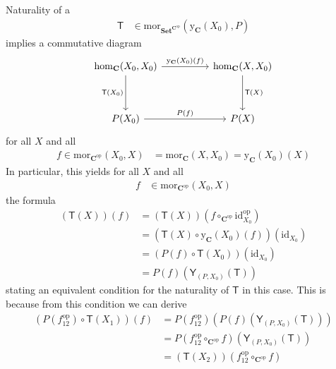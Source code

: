 \begin{prf}
Naturality of a
\begin{align*}
  \mathsf{T}
  &\in
  \mathrm{mor}_{\mathbf{Set}^{\mathbf{C}^{\mathrm{op}}}}
  (\mathrm{y}_{\mathbf{C}}(X_{0}),P)
\end{align*}
implies a commutative diagram
\[
\begin{tikzcd}[sep=huge]
  \mathrm{hom}_{\mathbf{C}}(X_{0},X_{0})
  \arrow{r}{\mathrm{y}_{\mathbf{C}}(X_{0})(f)}
  \arrow[swap]{d}{\mathsf{T}(X_{0})}
  &
  \mathrm{hom}_{\mathbf{C}}(X,X_{0})
  \arrow{d}{\mathsf{T}(X)}
  \\
  P(X_{0})
  \arrow{r}{P(f)}
  &
  P(X)
\end{tikzcd}
\]
for all $X$ and all
\begin{align*}
  f
  \in
  \mathrm{mor}_{\mathbf{C}^{\mathrm{op}}}(X_{0},X)
  &=
  \mathrm{mor}_{\mathbf{C}}(X,X_{0})
  =
  \mathrm{y}_{\mathbf{C}}(X_{0})(X)
\end{align*}  
In particular, this yields for all $X$ and all
\begin{align*}
  f
  &\in
  \mathrm{mor}_{\mathbf{C}^{\mathrm{op}}}(X_{0},X)
\end{align*}
the formula
\begin{align*}
  (\mathsf{T}(X))(f)
  &=
  (\mathsf{T}(X))
  \left(
    f
    \circ_{\mathbf{C}^{\mathrm{op}}}
    \mathrm{id}_{X_{0}}^{\mathrm{op}}
  \right)
  \\
  &=
  \left(
    \mathsf{T}(X)
    \circ
    \mathrm{y}_{\mathbf{C}}(X_{0})(f)
  \right)
  (\mathrm{id}_{X_{0}})
  \\
  &=
  \left(
    P(f)
    \circ
    \mathsf{T}(X_{0})
  \right)
  (\mathrm{id}_{X_{0}})
  \tag{NT}
  \\
  &=
  P(f)(\mathsf{Y}_{(P,X_{0})}(\mathsf{T}))
\end{align*}
stating an equivalent condition for the naturality of $\mathsf{T}$ in this case.
This is because from this condition we can derive
\begin{align*}
  \left(
    P(f_{12}^{\textrm{op}})
    \circ
    \mathsf{T}(X_{1})
  \right)
  (f)
  &=
  P(f_{12}^{\textrm{op}})
  \left(
    P(f)(\mathsf{Y}_{(P,X_{0})}(\mathsf{T}))
  \right)
  \\
  &=
  P
  \left(
    f_{12}^{\textrm{op}}
    \circ_{\mathbf{C}^{\textrm{op}}}
    f
  \right)
  (\mathsf{Y}_{(P,X_{0})}(\mathsf{T}))
  \\
  &=
  (\mathsf{T}(X_{2}))
  \left(
    f_{12}^{\textrm{op}}
    \circ_{\mathbf{C}^{\textrm{op}}}
    f
  \right)
  \\

\end{align*}
\end{prf}
